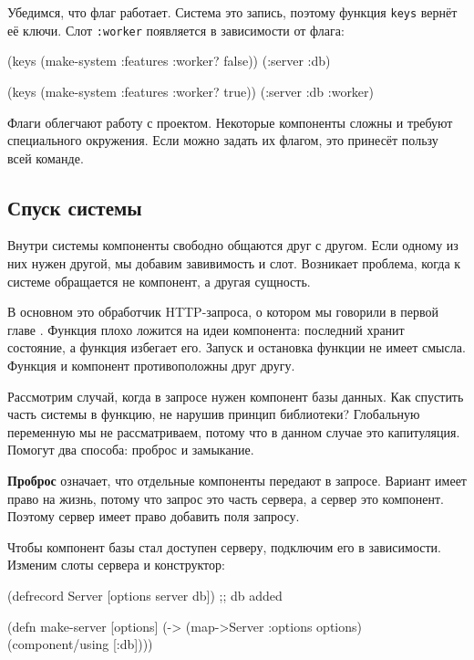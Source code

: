 Убедимся, что флаг работает. Система это запись, поэтому функция \verb|keys|
вернёт её ключи. Слот \verb|:worker| появляется в зависимости от флага:

\begin{english}
  \begin{clojure}
(keys (make-system {:features {:worker? false}}))
(:server :db)

(keys (make-system {:features {:worker? true}}))
(:server :db :worker)
  \end{clojure}
\end{english}

Флаги облегчают работу с проектом. Некоторые компоненты сложны и требуют
специального окружения. Если можно задать их флагом, это принесёт пользу
всей команде.

\subsection{Спуск системы}


Внутри системы компоненты свободно общаются друг с другом. Если одному из них
нужен другой, мы добавим завивимость и слот. Возникает проблема, когда к системе
обращается не компонент, а другая сущность.

В основном это обработчик HTTP-запроса, о котором мы говорили в первой
главе . Функция плохо ложится на идеи компонента: последний
хранит состояние, а функция избегает его. Запуск и остановка функции не имеет
смысла. Функция и компонент противоположны друг другу.

Рассмотрим случай, когда в запросе нужен компонент базы данных. Как спустить
часть системы в функцию, не нарушив принцип библиотеки? Глобальную переменную мы
не рассматриваем, потому что в данном случае это капитуляция. Помогут два
способа: проброс и замыкание.


\textbf{Проброс} означает, что отдельные компоненты передают в запросе. Вариант
имеет право на жизнь, потому что запрос это часть сервера, а сервер это
компонент. Поэтому сервер имеет право добавить поля запросу.

Чтобы компонент базы стал доступен серверу, подключим его в зависимости. Изменим
слоты сервера и конструктор:

\begin{english}
  \begin{clojure}
(defrecord Server
  [options server db]) ;; db added

(defn make-server
  [options]
  (-> (map->Server {:options options})
      (component/using [:db])))
  \end{clojure}
\end{english}

